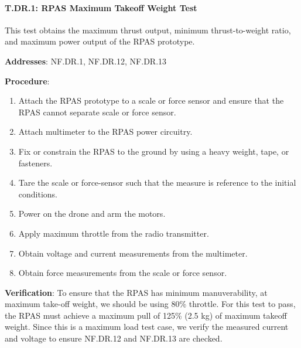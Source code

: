 \paragraph{T.DR.1: RPAS Maximum Takeoff Weight Test}

This test obtains the maximum thrust output, minimum thrust-to-weight ratio, and maximum power output of the RPAS prototype.

\textbf{Addresses}:  NF.DR.1, NF.DR.12, NF.DR.13

\textbf{Procedure}:
\begin{enumerate}[noitemsep]
    \item Attach the RPAS prototype to a scale or force sensor and ensure that the RPAS cannot separate scale or force sensor.
    \item Attach multimeter to the RPAS power circuitry.
    \item Fix or constrain the RPAS to the ground by using a heavy weight, tape, or fasteners.
    \item Tare the scale or force-sensor such that the measure is reference to the initial conditions.
    \item Power on the drone and arm the motors.
    \item Apply maximum throttle from the radio transmitter.
    \item Obtain voltage and current measurements from the multimeter.
    \item Obtain force measurements from the scale or force sensor.
\end{enumerate}

\textbf{Verification}: 
To ensure that the RPAS has minimum manuverability, at maximum take-off weight, we should be using 80\% throttle. For this test to pass, the RPAS must achieve a maximum pull of 125\% (2.5 kg) of maximum takeoff weight. Since this is a maximum load test case, we verify the measured current and voltage to ensure NF.DR.12 and NF.DR.13 are checked.
